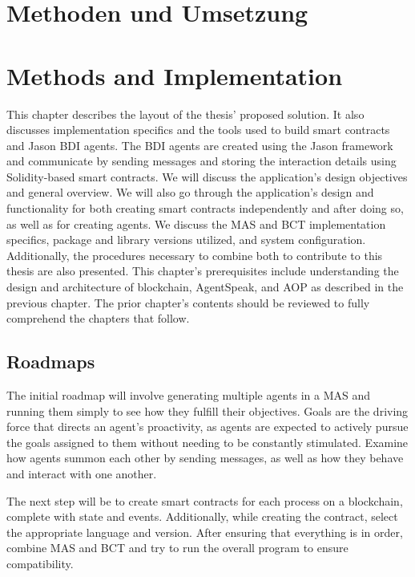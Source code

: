 {\chapter{Methoden und Umsetzung}}
{\chapter{Methods and Implementation}}
\label{sec:methods}


This chapter describes the layout of the thesis' proposed solution. It also discusses implementation specifics and the tools used to build smart contracts and Jason \ac{BDI} agents. The \ac{BDI} agents are created using the Jason framework and communicate by sending messages and storing the interaction details using Solidity-based smart contracts. We will discuss the application's design objectives and general overview. We will also go through the application's design and functionality for both creating smart contracts independently and after doing so, as well as for creating agents. We discuss the \ac{MAS} and \ac{BCT} implementation specifics, package and library versions utilized, and system configuration. Additionally, the procedures necessary to combine both to contribute to this thesis are also presented. This chapter's prerequisites include understanding the design and architecture of blockchain, AgentSpeak, and \ac{AOP} as described in the previous chapter. The prior chapter's contents should be reviewed to fully comprehend the chapters that follow.

\section{Roadmaps}

The initial roadmap will involve generating multiple agents in a \ac{MAS} and running them simply to see how they fulfill their objectives. Goals are the driving force that directs an agent's proactivity, as agents are expected to actively pursue the goals assigned to them without needing to be constantly stimulated. Examine how agents summon each other by sending messages, as well as how they behave and interact with one another. 

\vspace{.5cm}

The next step will be to create smart contracts for each process on a blockchain, complete with state and events. Additionally, while creating the contract, select the appropriate language and version. After ensuring that everything is in order, combine \ac{MAS} and \ac{BCT} and try to run the overall program to ensure compatibility.

